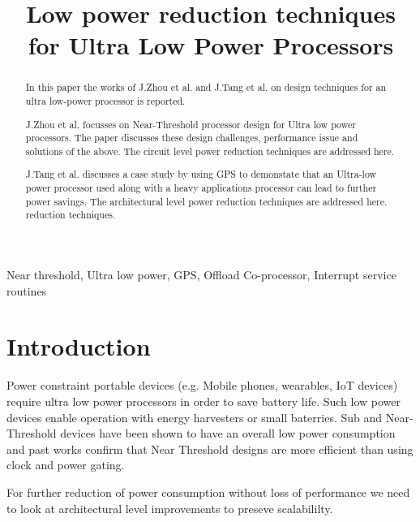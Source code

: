 \documentclass[conference]{IEEEtran}
\begin{document}
\title{Low power reduction techniques for Ultra Low Power Processors}

\author{
}

\maketitle

\begin{abstract}
In this paper the works of J.Zhou et al. \cite{b1} and J.Tang et al. \cite{b2}
on design techniques for an ultra low-power processor is reported.

J.Zhou et al. focusses on Near-Threshold processor design for Ultra low power
processors. The paper discusses these design challenges, performance issue and solutions
of the above. The circuit level power reduction techniques are addressed here.

J.Tang et al. discusses a case study by using GPS to demonstate that an
Ultra-low power processor used along with a heavy applications processor can
lead to further power savings. The architectural level power reduction
techniques are addressed here.
reduction techniques.
\end{abstract}

\begin{IEEEkeywords}
Near threshold, Ultra low power, GPS, Offload Co-processor, Interrupt service
routines
\end{IEEEkeywords}

\section{Introduction} \label{sec:introduction}

Power constraint portable devices (e.g. Mobile phones, wearables, IoT
devices) require ultra low power processors in order to save battery life. Such
low power devices enable operation with energy harvesters or small baterries.
Sub and Near-Threshold devices have been shown to have an overall low power
consumption and past works confirm that Near Threshold designs are more
efficient than using clock and power gating.

For further reduction of power consumption without loss of performance we need to look at architectural
level improvements to preseve scalabililty.
\end{document}
